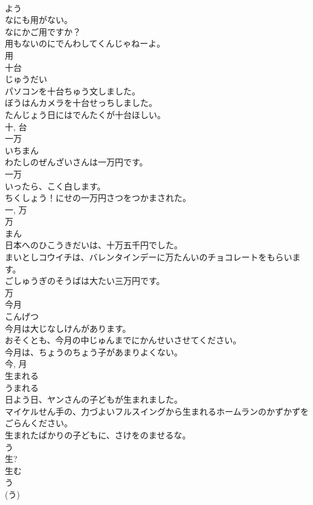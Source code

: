 \documentclass[8pt]{extreport}
\begin{document}
\begin{CJK}{UTF8}{min}
\\	よう	
\\	なにも用がない。	
\\	なにかご用ですか？	
\\	用もないのにでんわしてくんじゃねーよ。	
\\	用	
\\	十台	
\\	じゅうだい	
\\	パソコンを十台ちゅう文しました。	
\\	ぼうはんカメラを十台せっちしました。	
\\	たんじょう日にはでんたくが十台ほしい。	
\\	十, 台	
\\	一万	
\\	いちまん	
\\	わたしのぜんざいさんは一万円です。	
\\	一万
\\	いったら、こく白します。	
\\	ちくしょう！にせの一万円さつをつかまされた。	
\\	一, 万	
\\	万	
\\	まん	
\\	日本へのひこうきだいは、十万五千円でした。	
\\	まいとしコウイチは、バレンタインデーに万たんいのチョコレートをもらいます。	
\\	ごしゅうぎのそうばは大たい三万円です。	
\\	万	
\\	今月	
\\	こんげつ	
\\	今月は大じなしけんがあります。	
\\	おそくとも、今月の中じゅんまでにかんせいさせてください。	
\\	今月は、ちょうのちょう子があまりよくない。	
\\	今, 月	
\\	生まれる	
\\	うまれる	
\\	日よう日、ヤンさんの子どもが生まれました。	
\\	マイケルせん手の、力づよいフルスイングから生まれるホームランのかずかずをごらんください。	
\\	生まれたばかりの子どもに、さけをのませるな。	
\\	う 
\\	生? 
\\	生む 
\\	う 
\\	(う) 

\end{CJK}
\end{document}
